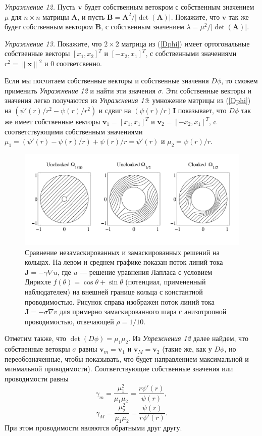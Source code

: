 \documentclass[a4paper, 12pt]{article}
\newcommand{\normb}[1]{\left\lVert\textbf{#1}\right\rVert}
\begin{document}
\textit{Упражнение 12.} Пусть $\textbf{v}$ будет собственным ветокром с собственным
значением $\mu$ для $n \times n$ матрицы $\textbf{A}$, и пусть $\textbf{B} =
\textbf{A}^2/|\det(\textbf{A})|$. Покажите, что $\textbf{v}$ так же будет собственным 
вектором $\textbf{B}$, с собственным значением $\lambda = \mu^2/|\det(\textbf{A})|$.

\textit{Упражнение 13.} Покажите, что $2 \times 2$ матрица из (\ref{Dphi}) имеет
ортогональные собственные векторы $[x_1, x_2]^T$ и $[-x_2, x_1]^T$, с собственными
значениями $r^2 = \normb{x}^2$ и $0$ соответсвенно.

Если мы посчитаем  собственные векторы и собственные значения $D\phi$, то сможем 
применить \textit{Упражнение 12} и найти эти значения $\sigma$. Эти собственные
векторы и значения легко получаются из \textit{Упражнения 13}: умножение матрицы
из (\ref{Dphi}) на $(\psi'(r)/r^2-\psi(r)/r^2)$ и сдвиг на $(\psi(r)/r)\textbf{I}$
показывает, что $D\phi$ так же имеет собственные векторы $\textbf{v}_1 = [x_1, x_1]^T$
и $\textbf{v}_2 = [-x_2, x_1]^T$, c соответствующими собственным значениями
$\mu_1 = (\psi'(r)-\psi(r)/r)+\psi(r)/r = \psi'(r)$ и $\mu_2 = \psi(r)/r$.
\begin{figure}[t]
  \centering
  \includegraphics[height=0.15\paperheight]{5.png}
  \caption{Сравнение незамаскированных и замаскированных решений на кольцах. На левом
  и среднем графике показан поток линий тока $\textbf{J} = -\gamma \nabla u$, 
  где $u$ ---   решение уравнения Лапласа с условием Дирихле 
  $f(\theta) = \cos \theta + \sin\theta$  (потенциал, примененный наблюдателем) на
   внешней границе кольца с константной проводимостью. Рисунок справа изображен
   поток линий тока $\textbf{J} = -\sigma \nabla v$ для примерно замаскированного
   шара с анизотропной проводимостью, отвечающей $\rho = 1/10$.}
  \label{fig:5}
\end{figure}
Отметим также, что $\det(D\phi) = \mu_1\mu_2$. Из \textit{Упрежнения 12} далее найдем,
что собственные ветокры $\sigma$ равны $\textbf{v}_m = \textbf{v}_1$ и
$\textbf{v}_{M}=\textbf{v}_2$ (такие же, как у $D\phi$, но переобозначенные, чтобы
показывать, что будет направлением максимальной и минмальной проводимости).
Соответствующие собственные значения или проводимости равны
\begin{equation*}
\gamma_m = \frac{\mu_1^2}{\mu_1\mu_2} = \frac{r\psi'(r)}{\psi(r)},
\end{equation*}
\begin{equation}\label{eigenvalues}
\gamma_M = \frac{\mu_2^2}{\mu_1\mu_2} = \frac{\psi(r)}{r\psi'(r)}.
\end{equation}
При этом проводимости являются обратными друг другу.
\end{document}
